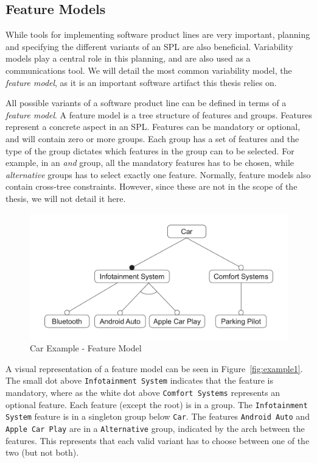 \documentclass[a4paper,english]{ifimaster}
\begin{document}
\subsection{Feature Models}%
\label{sub:feature_models}

While tools for implementing software product lines are very important, planning and specifying the different variants of an SPL are also beneficial. Variability models play a central role in this planning, and are also used as a communications tool. We will detail the most common variability model, the \textit{feature model}, as it is an important software artifact this thesis relies on.

All possible variants of a software product line can be defined in terms of a \textit{feature model}. A feature model is a tree structure of features and groups. Features represent a concrete aspect in an SPL. Features can be mandatory or optional, and will contain zero or more groups. Each group has a set of features and the type of the group dictates which features in the group can to be selected. For example, in an \textit{and} group, all the mandatory features has to be chosen, while \textit{alternative} groups has to select exactly one feature. Normally, feature models also contain cross-tree constraints. However, since these are not in the scope of the thesis, we will not detail it here.

\begin{figure}[htpb]
	\centering
	\includegraphics[width=0.8\linewidth]{illustrations/example.pdf}
	\caption{Car Example - Feature Model}%
	\label{fig:example1}
\end{figure}

A visual representation of a feature model can be seen in Figure~\vref{fig:example1}. The small dot above \texttt{Infotainment System} indicates that the feature is mandatory, where as the white dot above \texttt{Comfort Systems} represents an optional feature. Each feature (except the root) is in a group. The \texttt{Infotainment System} feature is in a singleton group below \texttt{Car}. The features \texttt{Android Auto} and \texttt{Apple Car Play} are in a \texttt{Alternative} group, indicated by the arch between the features. This represents that each valid variant has to choose between one of the two (but not both).
\end{document}
